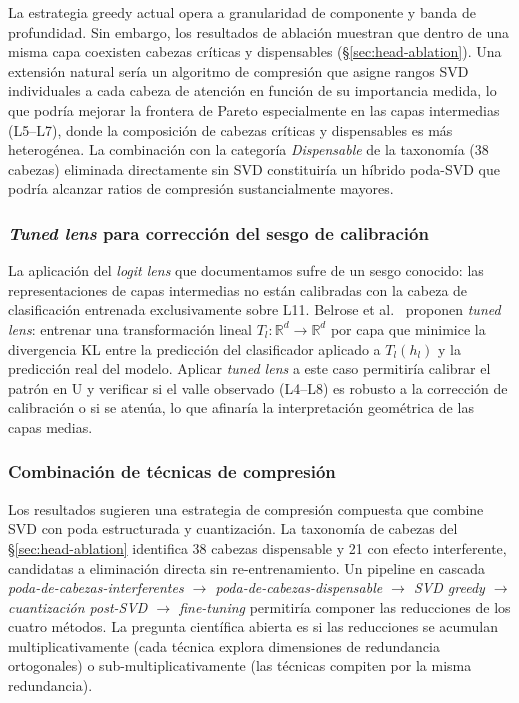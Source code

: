 La estrategia greedy actual opera a granularidad de componente y banda de
profundidad. Sin embargo, los resultados de ablación muestran que dentro de
una misma capa coexisten cabezas críticas y dispensables
(\S\ref{sec:head-ablation}). Una extensión natural sería un algoritmo de
compresión que asigne rangos SVD individuales a cada cabeza de atención en
función de su importancia medida, lo que podría mejorar la frontera de
Pareto especialmente en las capas intermedias (L5--L7), donde la
composición de cabezas críticas y dispensables es más heterogénea. La
combinación con la categoría \emph{Dispensable} de la taxonomía
(38 cabezas) eliminada directamente sin SVD constituiría un híbrido
poda-SVD que podría alcanzar ratios de compresión sustancialmente mayores.

\subsubsection{\emph{Tuned lens} para corrección del sesgo de calibración}

La aplicación del \emph{logit lens} que documentamos sufre de un sesgo conocido:
las representaciones de capas intermedias no están calibradas con la cabeza
de clasificación entrenada exclusivamente sobre L11. Belrose et
al.~\cite{belrose2023eliciting} proponen \textit{tuned lens}: entrenar una
transformación lineal $T_l: \mathbb{R}^d \to \mathbb{R}^d$ por capa que
minimice la divergencia KL entre la predicción del clasificador aplicado a
$T_l(h_l)$ y la predicción real del modelo. Aplicar \emph{tuned lens} a este caso
permitiría calibrar el patrón en U y verificar si el valle observado
(L4--L8) es robusto a la corrección de calibración o si se atenúa, lo que
afinaría la interpretación geométrica de las capas medias.

\subsubsection{Combinación de técnicas de compresión}

Los resultados sugieren una estrategia de compresión compuesta que combine
SVD con poda estructurada y cuantización. La taxonomía de cabezas del
\S\ref{sec:head-ablation} identifica 38 cabezas dispensable y 21 con
efecto interferente, candidatas a eliminación directa sin re-entrenamiento.
Un pipeline en cascada \textit{poda-de-cabezas-interferentes
$\rightarrow$ poda-de-cabezas-dispensable $\rightarrow$ SVD greedy
$\rightarrow$ cuantización post-SVD $\rightarrow$ \emph{fine-tuning}} permitiría
componer las reducciones de los cuatro métodos. La pregunta científica
abierta es si las reducciones se acumulan multiplicativamente (cada técnica
explora dimensiones de redundancia ortogonales) o sub-multiplicativamente
(las técnicas compiten por la misma redundancia).

